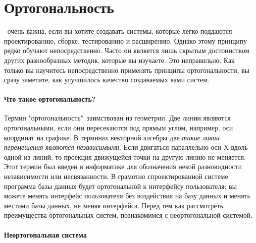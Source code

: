 \section{Ортогональность}


\ очень важна, если вы хотите создавать системы, которые
легко поддаются проектированию, сборке, тестированию и расширению. Однако этому
принципу редко обучают непосредственно. Часто он является лишь скрытым
достоинством других разнообразных методик, которые вы изучаете. Это неправильно.
Как только вы научитесь непосредственно применять принципы ортогональности, вы
сразу заметите, как улучшилось качество создаваемых вами систем.

\paragraph{Что такое ортогональность?}

Термин "ортогональность"\ заимствован из геометрии. Две линии являются
ортогональными, если они пересекаются под прямым углом, например, оси координат
на графике. В терминах векторной алгебры две \emph{такие линии перемещения
являются независимыми}. Если двигаться параллельно оси X вдоль одной из линий,
то проекция движущейся точки на другую линию не меняется. Этот термин был введен
в информатике для обозначения некой разновидности независимости или
несвязанности. В грамотно спроектированной системе программа базы данных будет
ортогональной к интерфейсу пользователя: вы можете менять интерфейс пользователя
без воздействия на базу данных и менять местами базы данных, не меняя
интерфейса. Перед тем как рассмотреть преимущества ортогональных систем,
познакомимся с неортогональной системой.

\paragraph{Неортогональная система}

